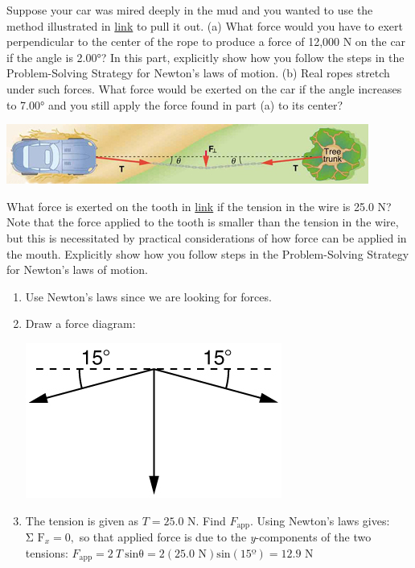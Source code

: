 \documentclass[
]{book}
\newenvironment{problems-exercises}{}{}
\begin{document}
\begin{problems-exercises}
\hypertarget{fs-id1389092}{}
\leavevmode\hypertarget{fs-id1642344}{}%
Suppose your car was mired deeply in the mud and you wanted to use the
method illustrated in
\protect\hyperlink{import-auto-id1436345}{link} to pull it out.
(a) What force would you have to exert perpendicular to the center of
the rope to produce a force of 12,000 N on the car if the angle is
2.00°? In this part, explicitly show how you follow the steps in the
Problem-Solving Strategy for Newton's laws of motion. (b) Real ropes
stretch under such forces. What force would be exerted on the car if the
angle increases to 7.00° and you still apply the force found in part (a)
to its center?

\includegraphics{images/Figure_04_06_09.jpg}

\hypertarget{fs-id2607890}{}
\leavevmode\hypertarget{fs-id2004302}{}%
What force is exerted on the tooth in
\protect\hyperlink{import-auto-id1569692}{link} if the tension in
the wire is 25.0 N? Note that the force applied to the tooth is smaller
than the tension in the wire, but this is necessitated by practical
considerations of how force can be applied in the mouth. Explicitly show
how you follow steps in the Problem-Solving Strategy for Newton's laws
of motion.

\hypertarget{fs-id2324943}{}
\begin{enumerate}
\def\labelenumi{\arabic{enumi}.}
\item
  Use Newton's laws since we are looking for forces.
\item
  Draw a force diagram:

  \includegraphics{images/Figure_04_06_06.jpg}
\item
  The tension is given as \({T = \text{25.0\ N.}}{}\) Find
  \({F_{\text{app}}\text{.}}{}\) Using Newton's laws gives:
  \({\text{Σ\ F}_{x} = 0,}{}\) so that applied force is due to the
  \emph{y}-components of the two tensions:
  \({{F_{\text{app}} = 2\ }T\ \text{sin}{\text{θ} = 2}(\text{25.0\ N})\text{sin}\left( \text{15º} \right)}{} = \text{12.9\ N}\)


\end{enumerate}
\end{problems-exercises}
\end{document}
